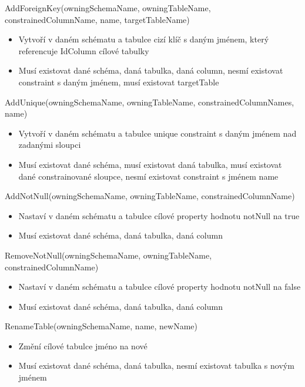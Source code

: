 \documentclass[11pt,twoside,a4paper]{book}
\begin{document}
\begin{list}{Operace :}{}
  \item AddForeignKey(owningSchemaName, owningTableName, constrainedColumnName,
  name, targetTableName)
  \begin{itemize}
    \item Vytvoří v daném schématu a tabulce cizí klíč s daným jménem, který
    referencuje IdColumn cílové tabulky
    \item Musí existovat dané schéma, daná tabulka, daná column, nesmí existovat
    constraint s daným jménem, musí existovat targetTable
  \end{itemize}
  
  \item AddUnique(owningSchemaName, owningTableName,
  constrainedColumnNames, name)
  \begin{itemize}
    \item Vytvoří v daném schématu a tabulce unique constraint s daným jménem
    nad zadanými sloupci
    \item Musí existovat dané schéma, musí existovat daná tabulka, musí
    existovat dané constrainované sloupce, nesmí existovat constraint s jménem
    name
  \end{itemize}

  \item AddNotNull(owningSchemaName, owningTableName, constrainedColumnName)
  \begin{itemize}
    \item Nastaví v daném schématu a tabulce cílové property hodnotu notNull na
    true
    \item Musí existovat dané schéma, daná tabulka, daná column
  \end{itemize}

  \item RemoveNotNull(owningSchemaName, owningTableName, constrainedColumnName)
  \begin{itemize}
    \item Nastaví v daném schématu a tabulce cílové property hodnotu notNull na
    false
    \item Musí existovat dané schéma, daná tabulka, daná column
  \end{itemize}

  \item RenameTable(owningSchemaName, name, newName)
  \begin{itemize}
    \item Změní cílové tabulce jméno na nové
    \item Musí existovat dané schéma, daná tabulka, nesmí existovat tabulka s
    novým jménem
  \end{itemize}


\end{list}
\end{document}
